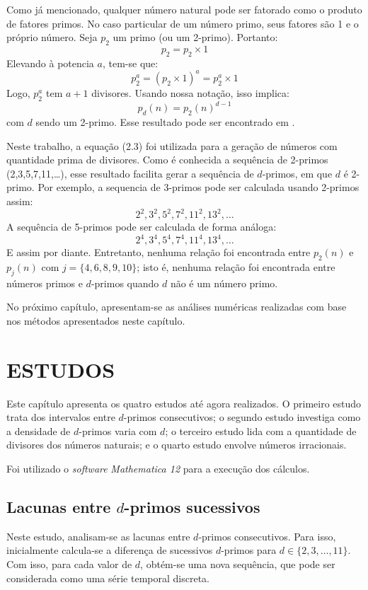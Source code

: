 \documentclass[12pt,a4paper,fleqn]{report}
\begin{document}
Como já mencionado, qualquer número natural pode ser fatorado como o produto de
 fatores primos. %
No caso particular de um número primo, seus fatores são 1 e o próprio número. Seja $p_2$ um primo (ou um 2-primo). Portanto:
\[p_2 = p_2\times1\]
Elevando à potencia $a$, tem-se que:
\[p_2^a = (p_2 \times 1)^a = p_2^a \times 1\]
Logo, $p_2^a$ tem $a+1$ divisores. Usando nossa notação, isso implica:
\begin{equation}
    p_d(n) = p_2(n)^{d-1}
    \label{relation}
\end{equation}
com $d$ sendo um 2-primo. Esse resultado pode ser
encontrado em \cite{a44}. 

Neste trabalho, a equação (2.3) foi utilizada para a geração de números com
quantidade prima de divisores. Como é 
conhecida a sequência de 2-primos (2,3,5,7,11,\ldots), esse resultado facilita
gerar a sequência de $d$-primos, em que $d$ é 2-primo. Por exemplo,
a sequencia de 3-primos pode ser calculada usando 2-primos assim: 
\[2^2,3^2,5^2,7^2,11^2,13^2,\ldots\]
A sequência de 5-primos pode ser calculada de forma análoga: 
\[2^4,3^4,5^4,7^4,11^4,13^4,\ldots\]
E assim por diante.
Entretanto,
nenhuma relação foi encontrada entre $p_2(n)$ e $p_j(n)$ com 
$j=\{4,6,8,9,10\}$; isto é, nenhuma relação foi encontrada entre
números primos e $d$-primos quando $d$ não é um número primo.



No próximo capítulo, apresentam-se as análises numéricas realizadas com base nos métodos apresentados neste capítulo.


\chapter{ESTUDOS}

Este capítulo apresenta os quatro  estudos até agora realizados. O primeiro estudo trata dos intervalos entre $d$-primos consecutivos; o segundo estudo investiga como a densidade de $d$-primos varia com $d$; o terceiro estudo lida com a quantidade de divisores dos números naturais; e o quarto estudo envolve números irracionais.

Foi utilizado o \emph{software} \emph{Mathematica 12} para a execução dos cálculos.

\section{Lacunas entre $d$-primos sucessivos}

Neste estudo, analisam-se as lacunas entre $d$-primos consecutivos. Para isso,
inicialmente calcula-se a diferença de sucessivos $d$-primos  para
$d \in \{2, 3, \ldots, 11\}$. Com isso, para cada valor de $d$, obtém-se uma nova sequência, que pode ser  considerada como
uma série temporal discreta.
\end{document}
